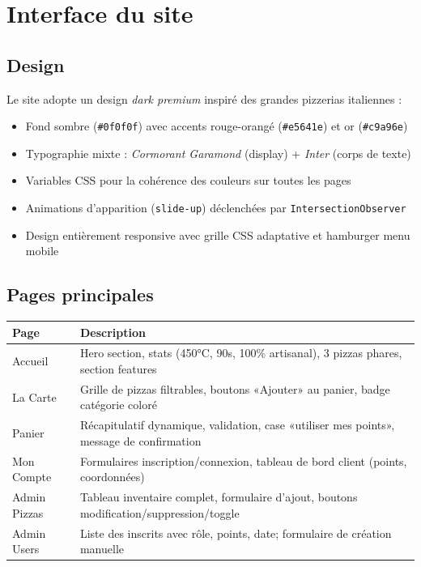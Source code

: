 \documentclass[a4paper,12pt]{article}
\begin{document}
\section{Interface du site}

\subsection{Design}

Le site adopte un design \textit{dark premium} inspiré des grandes pizzerias italiennes :

\begin{itemize}
    \item Fond sombre (\texttt{\#0f0f0f}) avec accents rouge-orangé (\texttt{\#e5641e}) et or (\texttt{\#c9a96e})
    \item Typographie mixte : \textit{Cormorant Garamond} (display) + \textit{Inter} (corps de texte)
    \item Variables CSS pour la cohérence des couleurs sur toutes les pages
    \item Animations d'apparition (\texttt{slide-up}) déclenchées par \texttt{IntersectionObserver}
    \item Design entièrement responsive avec grille CSS adaptative et hamburger menu mobile
\end{itemize}

\subsection{Pages principales}

\begin{center}
\renewcommand{\arraystretch}{1.4}
\begin{tabular}{|l|p{8.5cm}|}
\hline
\textbf{Page} & \textbf{Description} \\
\hline
Accueil & Hero section, stats (450°C, 90s, 100\% artisanal), 3 pizzas phares, section features \\
La Carte & Grille de pizzas filtrables, boutons «Ajouter» au panier, badge catégorie coloré \\
Panier & Récapitulatif dynamique, validation, case «utiliser mes points», message de confirmation \\
Mon Compte & Formulaires inscription/connexion, tableau de bord client (points, coordonnées) \\
Admin Pizzas & Tableau inventaire complet, formulaire d'ajout, boutons modification/suppression/toggle \\
Admin Users & Liste des inscrits avec rôle, points, date; formulaire de création manuelle \\
\hline
\end{tabular}
\end{center}
\end{document}
